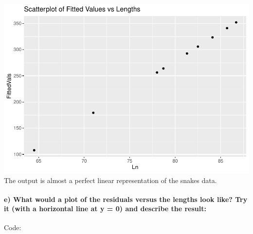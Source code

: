 \documentclass[
]{article}
\newenvironment{Shaded}{\begin{snugshade}}{\end{snugshade}}
\newcommand{\AttributeTok}[1]{\textcolor[rgb]{0.77,0.63,0.00}{#1}}
\newcommand{\DecValTok}[1]{\textcolor[rgb]{0.00,0.00,0.81}{#1}}
\newcommand{\FunctionTok}[1]{\textcolor[rgb]{0.00,0.00,0.00}{#1}}
\newcommand{\NormalTok}[1]{#1}
\newcommand{\OtherTok}[1]{\textcolor[rgb]{0.56,0.35,0.01}{#1}}
\newcommand{\SpecialCharTok}[1]{\textcolor[rgb]{0.00,0.00,0.00}{#1}}
\newcommand{\StringTok}[1]{\textcolor[rgb]{0.31,0.60,0.02}{#1}}
\begin{document}
\includegraphics{Class_Exercises_ClassNotes_5_files/figure-latex/unnamed-chunk-29-1.pdf}
The output is almost a perfect linear representation of the snakes data.
\newpage

\hypertarget{e-what-would-a-plot-of-the-residuals-versus-the-lengths-look-like-try-it-with-a-horizontal-line-at-y-0-and-describe-the-result}{%
\paragraph{e) What would a plot of the residuals versus the lengths look
like? Try it (with a horizontal line at y = 0) and describe the
result:}\label{e-what-would-a-plot-of-the-residuals-versus-the-lengths-look-like-try-it-with-a-horizontal-line-at-y-0-and-describe-the-result}}

\hfill\break
Code:

\begin{Shaded}
\end{Shaded}
\end{document}
